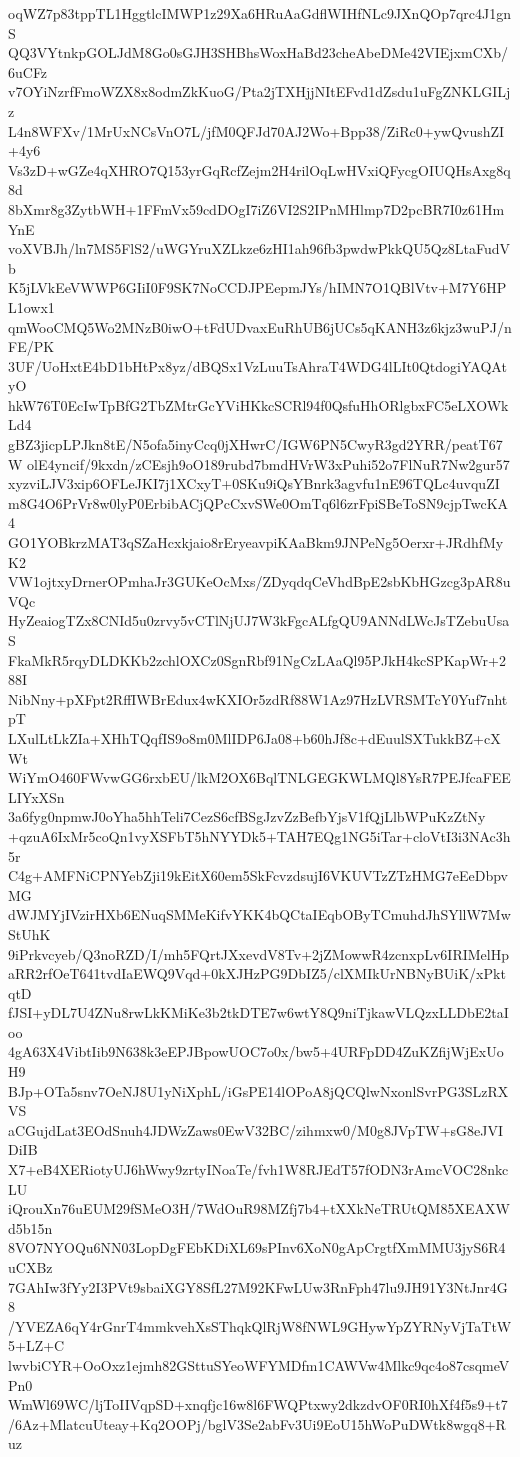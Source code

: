 oqWZ7p83tppTL1HggtlcIMWP1z29Xa6HRuAaGdflWIHfNLc9JXnQOp7qrc4J1gnS
QQ3VYtnkpGOLJdM8Go0sGJH3SHBhsWoxHaBd23cheAbeDMe42VIEjxmCXb/6uCFz
v7OYiNzrfFmoWZX8x8odmZkKuoG/Pta2jTXHjjNItEFvd1dZsdu1uFgZNKLGILjz
L4n8WFXv/1MrUxNCsVnO7L/jfM0QFJd70AJ2Wo+Bpp38/ZiRc0+ywQvushZI+4y6
Vs3zD+wGZe4qXHRO7Q153yrGqRcfZejm2H4rilOqLwHVxiQFycgOIUQHsAxg8q8d
8bXmr8g3ZytbWH+1FFmVx59cdDOgI7iZ6VI2S2IPnMHlmp7D2pcBR7I0z61HmYnE
voXVBJh/ln7MS5FlS2/uWGYruXZLkze6zHI1ah96fb3pwdwPkkQU5Qz8LtaFudVb
K5jLVkEeVWWP6GIiI0F9SK7NoCCDJPEepmJYs/hIMN7O1QBlVtv+M7Y6HPL1owx1
qmWooCMQ5Wo2MNzB0iwO+tFdUDvaxEuRhUB6jUCs5qKANH3z6kjz3wuPJ/nFE/PK
3UF/UoHxtE4bD1bHtPx8yz/dBQSx1VzLuuTsAhraT4WDG4lLIt0QtdogiYAQAtyO
hkW76T0EcIwTpBfG2TbZMtrGcYViHKkcSCRl94f0QsfuHhORlgbxFC5eLXOWkLd4
gBZ3jicpLPJkn8tE/N5ofa5inyCcq0jXHwrC/IGW6PN5CwyR3gd2YRR/peatT67W
olE4yncif/9kxdn/zCEsjh9oO189rubd7bmdHVrW3xPuhi52o7FlNuR7Nw2gur57
xyzviLJV3xip6OFLeJKI7j1XCxyT+0SKu9iQsYBnrk3agvfu1nE96TQLc4uvquZI
m8G4O6PrVr8w0lyP0ErbibACjQPcCxvSWe0OmTq6l6zrFpiSBeToSN9cjpTwcKA4
GO1YOBkrzMAT3qSZaHcxkjaio8rEryeavpiKAaBkm9JNPeNg5Oerxr+JRdhfMyK2
VW1ojtxyDrnerOPmhaJr3GUKeOcMxs/ZDyqdqCeVhdBpE2sbKbHGzcg3pAR8uVQc
HyZeaiogTZx8CNId5u0zrvy5vCTlNjUJ7W3kFgcALfgQU9ANNdLWcJsTZebuUsaS
FkaMkR5rqyDLDKKb2zchlOXCz0SgnRbf91NgCzLAaQl95PJkH4kcSPKapWr+288I
NibNny+pXFpt2RffIWBrEdux4wKXIOr5zdRf88W1Az97HzLVRSMTcY0Yuf7nhtpT
LXulLtLkZIa+XHhTQqfIS9o8m0MlIDP6Ja08+b60hJf8c+dEuulSXTukkBZ+cXWt
WiYmO460FWvwGG6rxbEU/lkM2OX6BqlTNLGEGKWLMQl8YsR7PEJfcaFEELIYxXSn
3a6fyg0npmwJ0oYha5hhTeli7CezS6cfBSgJzvZzBefbYjsV1fQjLlbWPuKzZtNy
+qzuA6IxMr5coQn1vyXSFbT5hNYYDk5+TAH7EQg1NG5iTar+cloVtI3i3NAc3h5r
C4g+AMFNiCPNYebZji19kEitX60em5SkFcvzdsujI6VKUVTzZTzHMG7eEeDbpvMG
dWJMYjIVzirHXb6ENuqSMMeKifvYKK4bQCtaIEqbOByTCmuhdJhSYllW7MwStUhK
9iPrkvcyeb/Q3noRZD/I/mh5FQrtJXxevdV8Tv+2jZMowwR4zcnxpLv6IRIMelHp
aRR2rfOeT641tvdIaEWQ9Vqd+0kXJHzPG9DbIZ5/clXMIkUrNBNyBUiK/xPktqtD
fJSI+yDL7U4ZNu8rwLkKMiKe3b2tkDTE7w6wtY8Q9niTjkawVLQzxLLDbE2taIoo
4gA63X4VibtIib9N638k3eEPJBpowUOC7o0x/bw5+4URFpDD4ZuKZfijWjExUoH9
BJp+OTa5snv7OeNJ8U1yNiXphL/iGsPE14lOPoA8jQCQlwNxonlSvrPG3SLzRXVS
aCGujdLat3EOdSnuh4JDWzZaws0EwV32BC/zihmxw0/M0g8JVpTW+sG8eJVIDiIB
X7+eB4XERiotyUJ6hWwy9zrtyINoaTe/fvh1W8RJEdT57fODN3rAmcVOC28nkcLU
iQrouXn76uEUM29fSMeO3H/7WdOuR98MZfj7b4+tXXkNeTRUtQM85XEAXWd5b15n
8VO7NYOQu6NN03LopDgFEbKDiXL69sPInv6XoN0gApCrgtfXmMMU3jyS6R4uCXBz
7GAhIw3fYy2I3PVt9sbaiXGY8SfL27M92KFwLUw3RnFph47lu9JH91Y3NtJnr4G8
/YVEZA6qY4rGnrT4mmkvehXsSThqkQlRjW8fNWL9GHywYpZYRNyVjTaTtW5+LZ+C
lwvbiCYR+OoOxz1ejmh82GSttuSYeoWFYMDfm1CAWVw4Mlkc9qc4o87csqmeVPn0
WmWl69WC/ljToIIVqpSD+xnqfjc16w8l6FWQPtxwy2dkzdvOF0RI0hXf4f5s9+t7
/6Az+MlatcuUteay+Kq2OOPj/bglV3Se2abFv3Ui9EoU15hWoPuDWtk8wgq8+Ruz
